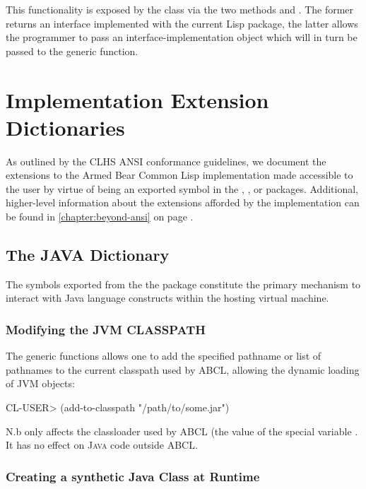 \documentclass[10pt]{book}
\begin{document}
This functionality is exposed by the class  via
the two methods  and
. The former returns an interface
implemented with the current Lisp package, the latter allows the
programmer to pass an interface-implementation object which will in turn
be passed to the  generic function.


\section{Implementation Extension Dictionaries}

As outlined by the \textsc{CLHS} \textsc{ANSI} conformance guidelines,
we document the extensions to the Armed Bear Common Lisp
implementation made accessible to the user by virtue of being an
exported symbol in the , , or
 packages.  Additional, higher-level information
about the extensions afforded by the implementation can be found in
\ref{chapter:beyond-ansi} on page \pageref{chapter:beyond-ansi}.

\subsection{The JAVA Dictionary}

The symbols exported from the the  package constitute the
primary mechanism to interact with Java language constructs within the
hosting virtual machine.

\subsubsection{Modifying the JVM CLASSPATH}

The  generic functions allows one to add the
specified pathname or list of pathnames to the current classpath
used by \textsc{ABCL}, allowing the dynamic loading of \textsc{JVM} objects:

\begin{listing-lisp}
CL-USER> (add-to-classpath "/path/to/some.jar")
\end{listing-lisp}

N.b  only affects the classloader used by \textsc{ABCL}
(the value of the special variable . It has
no effect on \textsc{Java} code outside \textsc{ABCL}.

\subsubsection{Creating a synthetic Java Class at Runtime}
\end{document}
